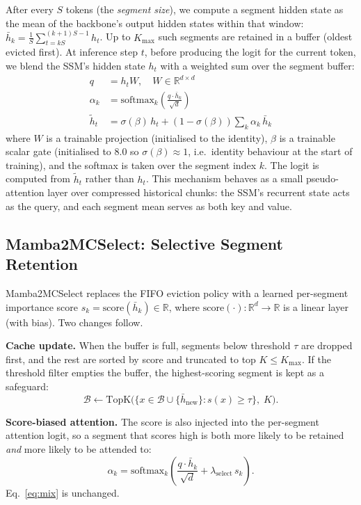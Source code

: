 \documentclass[conference]{IEEEtran}
\begin{document}
After every $S$ tokens (the \emph{segment size}), we compute a segment hidden state as the mean of the backbone's output hidden states within that window: $\bar{h}_k = \frac{1}{S}\sum_{t=kS}^{(k+1)S-1} h_t$. Up to $K_{\max}$ such segments are retained in a buffer (oldest evicted first). At inference step $t$, before producing the logit for the current token, we blend the SSM's hidden state $h_t$ with a weighted sum over the segment buffer:
\begin{align}
    q &= h_t W,\quad W \in \mathbb{R}^{d \times d} \label{eq:query} \\
    \alpha_k &= \mathrm{softmax}_k\!\left(\frac{q \cdot \bar{h}_k}{\sqrt{d}}\right) \label{eq:scores} \\
    \tilde{h}_t &= \sigma(\beta)\, h_t + (1 - \sigma(\beta))\sum_{k} \alpha_k\, \bar{h}_k \label{eq:mix}
\end{align}
where $W$ is a trainable projection (initialised to the identity), $\beta$ is a trainable scalar gate (initialised to $8.0$ so $\sigma(\beta)\!\approx\!1$, i.e.\ identity behaviour at the start of training), and the softmax is taken over the segment index $k$. The logit is computed from $\tilde{h}_t$ rather than $h_t$. This mechanism behaves as a small pseudo-attention layer over compressed historical chunks: the SSM's recurrent state acts as the query, and each segment mean serves as both key and value.

\subsection{Mamba2MCSelect: Selective Segment Retention}

Mamba2MCSelect replaces the FIFO eviction policy with a learned per-segment importance score $s_k = \mathrm{score}(\bar h_k) \in \mathbb R$, where $\mathrm{score}(\cdot):\mathbb R^d\to\mathbb R$ is a linear layer (with bias). Two changes follow.

\textbf{Cache update.} When the buffer is full, segments below threshold $\tau$ are dropped first, and the rest are sorted by score and truncated to top $K\!\le\!K_{\max}$. If the threshold filter empties the buffer, the highest-scoring segment is kept as a safeguard:
\begin{equation}
    \mathcal{B} \leftarrow \mathrm{TopK}\!\Big(\{x \in \mathcal{B}\cup\{\bar{h}_{\text{new}}\} : s(x) \ge \tau\},\; K\Big).
\end{equation}

\textbf{Score-biased attention.} The score is also injected into the per-segment attention logit, so a segment that scores high is both more likely to be retained \emph{and} more likely to be attended to:
\begin{equation}
    \alpha_k = \mathrm{softmax}_k\!\left(\frac{q\cdot \bar{h}_k}{\sqrt{d}} + \lambda_{\text{select}}\, s_k\right).
\end{equation}
Eq.~\eqref{eq:mix} is unchanged.
\end{document}
